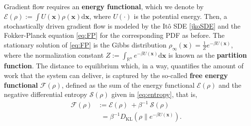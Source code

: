 \documentclass[letterpaper,10pt,twocolumn,conference]{ieeeconf}
\newtheorem{remark}{Remark}
\newcommand{\cD}{{\mathscr{D}}}
\newcommand{\bbx}{{\bm{x}}}
\begin{document}
Gradient flow requires an {\bf energy functional}, which we denote by
$\mathcal{E}\left(\rho\right):=\int U(\bm{x})\rho(\bm{x})\mathrm{d}\bbx$, where $U(\cdot)$ is the potential energy. Then, a stochastically driven gradient flow is modeled by the It\^{o} SDE
\eqref{jkoSDE}	
and the Fokker-Planck equation
\eqref{eq:FP}
for the corresponding PDF as before. The stationary solution of \eqref{eq:FP} is the Gibbs distribution $\rho_\infty(\bm{x})=\frac{1}{Z}e^{-\beta U(\bm{x})}$, where the normalization constant $Z:=\int_{\mathbb{R}^{n}} e^{-\beta U(\bbx)}\mathrm{d}\bbx$ is known as the \textbf{partition function}. The distance to equilibrium which, in a way, quantifies the amount of work that the system can deliver, is captured by the so-called \textbf{free energy functional} $\mathcal{F}\left(\rho\right)$, defined as the sum of the energy functional $\mathcal{E}\left(\rho\right)$ and the negative differential entropy
$\mathcal{S}\left(\rho\right)$ given in \eqref{eq:entropy}, that is,
\begin{subequations}\label{FreeEnergyDefn}
\begin{align}
	\mathcal{F}\left(\rho\right) &:= \mathcal{E}\left(\rho\right) \: + \beta^{-1} \: \mathcal{S}\left(\rho\right)
	\label{FreeEnergyDefn_a}\\
	&\phantom{:}=\beta^{-1}D_{\mathrm{KL}}\left(\rho\| e^{-\beta U(\bm{x})}\right).\label{FreeEnergyDefn_b}
\end{align}
\end{subequations}


%
%
%
%
\end{document}
